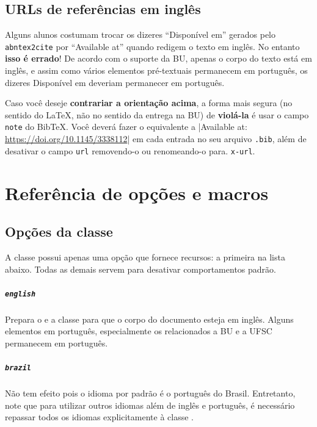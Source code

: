 \documentclass[embeddedlogo]{../ufsc-thesis-rn46-2019}
\begin{document}
\section{URLs de referências em inglês}

Alguns alunos costumam trocar os dizeres ``Disponível em'' gerados pelo
\texttt{abntex2cite} por ``Available at'' quando redigem o texto em inglês. No
entanto \textbf{isso é errado}! De acordo com o suporte da BU, apenas o corpo do
texto está em inglês, e assim como vários elementos pré-textuais permanecem em
português, os dizeres Disponível em deveriam permanecer em português.

Caso você deseje \textbf{contrariar a orientação acima}, a forma mais segura (no
sentido do LaTeX, não no sentido da entrega na BU) de \textbf{violá-la} é usar o
campo \texttt{note} do BibTeX. Você deverá fazer o equivalente a
\mt|Available at: \url{https://doi.org/10.1145/3338112}| em cada entrada no seu
arquivo \texttt{.bib}, além de desativar o campo \texttt{url} removendo-o ou renomeando-o
para. \texttt{x-url}.

\chapter{Referência de opções e macros}
\label{ch:ref}

\section{Opções da classe}

A classe possui apenas uma opção que fornece recursos: a primeira na lista
abaixo. Todas as demais servem para desativar comportamentos padrão.

\paragraph*{\texttt{english}} Prepara o \abnTeX{} e a classe para que o corpo
do documento esteja em inglês. Alguns elementos em português, especialmente os
relacionados a BU e a UFSC permanecem em português.

\paragraph*{\texttt{brazil}} Não tem efeito pois o idioma por padrão é o
português do Brasil. Entretanto, note que para utilizar outros idiomas além de
inglês e português, é necessário repassar todos os idiomas explicitamente à
classe \abnTeX.
\end{document}
